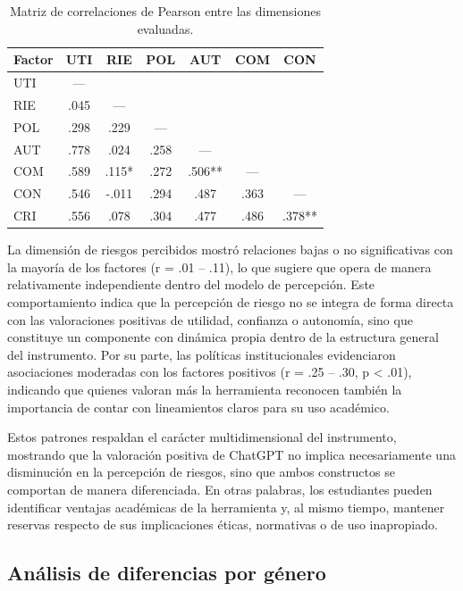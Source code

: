 \documentclass[spanish]{textolivre}
\begin{document}
\begin{table}[htbp]
\centering
\begin{threeparttable}
\caption{Matriz de correlaciones de Pearson entre las dimensiones evaluadas.}
\label{tab2}
\begin{tabular}{lcccccc}
\toprule
Factor & UTI & RIE & POL & AUT & COM & CON \\ 
\midrule
UTI & — & & & & & \\
RIE & .045 & — & & & & \\
POL & .298 & .229 & — & & & \\
AUT & .778 & .024 & .258 & — & & \\
COM & .589 & .115* & .272 & .506** & — & \\
CON & .546 & -.011 & .294 & .487 & .363 & — \\
CRI & .556 & .078 & .304 & .477 & .486 & .378** \\
\bottomrule
\end{tabular}
\end{threeparttable}
\end{table}

La dimensión de riesgos percibidos mostró relaciones bajas o no significativas con la mayoría de los factores (r = .01 – .11), lo que sugiere que opera de manera relativamente independiente dentro del modelo de percepción. Este comportamiento indica que la percepción de riesgo no se integra de forma directa con las valoraciones positivas de utilidad, confianza o autonomía, sino que constituye un componente con dinámica propia dentro de la estructura general del instrumento. Por su parte, las políticas institucionales evidenciaron asociaciones moderadas con los factores positivos (r = .25 – .30, p < .01), indicando que quienes valoran más la herramienta reconocen también la importancia de contar con lineamientos claros para su uso académico.

Estos patrones respaldan el carácter multidimensional del instrumento, mostrando que la valoración positiva de ChatGPT no implica necesariamente una disminución en la percepción de riesgos, sino que ambos constructos se comportan de manera diferenciada. En otras palabras, los estudiantes pueden identificar ventajas académicas de la herramienta y, al mismo tiempo, mantener reservas respecto de sus implicaciones éticas, normativas o de uso inapropiado.

\subsection{Análisis de diferencias por género}
\end{document}
